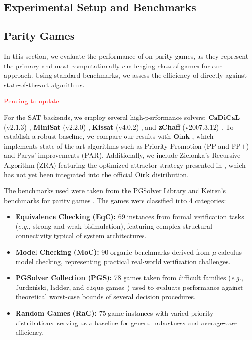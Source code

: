 \documentclass[a4paper,fleqn]{cas-sc}
\begin{document}
\subsection{Experimental Setup and Benchmarks}\label{sec:exp_setup}


\subsection{Parity Games}\label{sec:exp_parity}

In this section, we evaluate the performance of \nooppc on parity games, as they represent the primary and most computationally challenging class of games for our approach. Using standard benchmarks, we assess the efficiency of \nooppc directly against state-of-the-art algorithms.

\textcolor{red}{Pending to update}

For the SAT backends, we employ several high-performance solvers: \textbf{CaDiCaL} (v2.1.3) \cite{Biere:Cadical:2024}, \textbf{MiniSat} (v2.2.0) \cite{Een:MiniSat:2003}, \textbf{Kissat} (v4.0.2) \cite{Biere:Kissat:2024}, and \textbf{zChaff} (v2007.3.12) \cite{Moskewicz:zChaff:2001}. To establish a robust baseline, we compare our results with \textbf{Oink} \cite{vanDijk:2018}, which implements state-of-the-art algorithms such as Priority Promotion ($\text{PP}$ and $\text{PP+}$) and Parys' improvements ($\text{PAR}$). Additionally, we include Zielonka's Recursive Algorithm ($\text{ZRA}$) featuring the optimized attractor strategy presented in \cite{Aggarwal:2023}, which has not yet been integrated into the official Oink distribution.

The benchmarks used were taken from the PGSolver Library \cite{Friedmann:2017} and Keiren's benchmarks for parity games \cite{Keiren:2015}. The games were classified into 4 categories:

\begin{itemize}
\item \textbf{Equivalence Checking (EqC):} 69 instances from formal verification tasks ({\em e.g.}, strong and weak bisimulation), featuring complex structural connectivity typical of system architectures.
\item \textbf{Model Checking (MoC):} 90 organic benchmarks derived from $\mu$-calculus model checking, representing practical real-world verification challenges.
\item \textbf{PGSolver Collection (PGS):} 78 games taken from difficult families ({\em e.g.}, Jurdziński, ladder, and clique games~\cite{Benerecetti:2016}) used to evaluate performance against theoretical worst-case bounds of several decision procedures.
\item \textbf{Random Games (RaG):} 75 game instances with varied priority distributions, serving as a baseline for general robustness and average-case efficiency.
\end{itemize}
\end{document}
